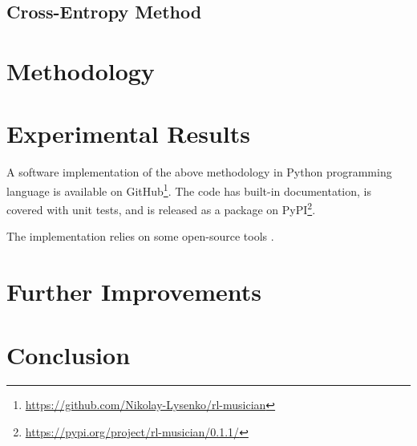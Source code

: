 \documentclass{article}
\begin{document}
\subsection{Cross-Entropy Method}
\label{subsec:crossentropy}


\section{Methodology}
\label{sec:approach}


\section{Experimental Results}
\label{sec:results}

A software implementation of the above methodology in Python programming language is available on GitHub\footnote{\url{https://github.com/Nikolay-Lysenko/rl-musician}}. The code has built-in documentation, is covered with unit tests, and is released as a package on PyPI\footnote{\url{https://pypi.org/project/rl-musician/0.1.1/}}.


The implementation relies on some open-source tools \cite{brockman2016openai,chollet2015keras,oliphant2006guide,raffel2014intuitive,dong2018pypianoroll}.


\section{Further Improvements}
\label{sec:improvements}


\section{Conclusion}
\label{sec:conclusion}


  

\end{document}
